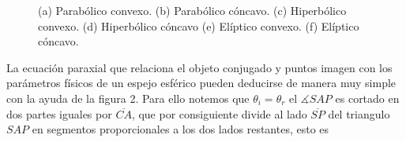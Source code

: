\documentclass[13,twocolumn,letterpaper]{article}
\begin{document}
{\begin{figure}[h!]
		\hspace{0.5 cm}
		\hspace{0.5 cm}
		\caption{{\small  {(a) Parabólico convexo. (b) Parabólico cóncavo. (c) Hiperbólico convexo. (d) Hiperbólico cóncavo (e) Elíptico convexo. (f) Elíptico cóncavo.}}}
		\label{fig:fig1}
	\end{figure}
La ecuación paraxial que relaciona el objeto conjugado y puntos imagen con los parámetros físicos de un espejo esférico pueden deducirse de manera muy simple con la ayuda de la figura 2. Para ello notemos que  $\theta_{i}=\theta_{r}$ el $\measuredangle SAP$ es cortado en dos partes iguales por $\overline{CA}$, que por consiguiente divide al lado $\overline{SP}$ del triangulo $SAP$ en segmentos proporcionales a los dos lados restantes, esto es
}
\end{document}
